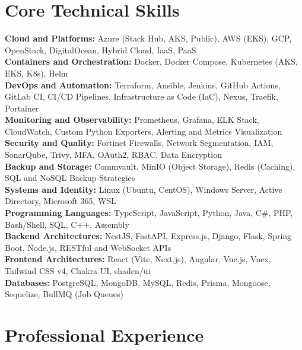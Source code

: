 \documentclass[10pt, letterpaper]{article}
\begin{document}
\section{Core Technical Skills}
\textbf{Cloud and Platforms:} Azure (Stack Hub, AKS, Public), AWS (EKS), GCP, OpenStack, DigitalOcean, Hybrid Cloud, IaaS, PaaS \\
\textbf{Containers and Orchestration:} Docker, Docker Compose, Kubernetes (AKS, EKS, K8s), Helm \\
\textbf{DevOps and Automation:} Terraform, Ansible, Jenkins, GitHub Actions, GitLab CI, CI/CD Pipelines, Infrastructure as Code (IaC), Nexus, Traefik, Portainer \\
\textbf{Monitoring and Observability:} Prometheus, Grafana, ELK Stack, CloudWatch, Custom Python Exporters, Alerting and Metrics Visualization \\
\textbf{Security and Quality:} Fortinet Firewalls, Network Segmentation, IAM, SonarQube, Trivy, MFA, OAuth2, RBAC, Data Encryption \\
\textbf{Backup and Storage:} Commvault, MinIO (Object Storage), Redis (Caching), SQL and NoSQL Backup Strategies \\
\textbf{Systems and Identity:} Linux (Ubuntu, CentOS), Windows Server, Active Directory, Microsoft 365, WSL \\
\textbf{Programming Languages:} TypeScript, JavaScript, Python, Java, C\#, PHP, Bash/Shell, SQL, C++, Assembly \\
\textbf{Backend Architectures:} NestJS, FastAPI, Express.js, Django, Flask, Spring Boot, Node.js, RESTful and WebSocket APIs \\
\textbf{Frontend Architectures:} React (Vite, Next.js), Angular, Vue.js, Vuex, Tailwind CSS v4, Chakra UI, shadcn/ui \\
\textbf{Databases:} PostgreSQL, MongoDB, MySQL, Redis, Prisma, Mongoose, Sequelize, BullMQ (Job Queues)

\section{Professional Experience}
\end{document}
